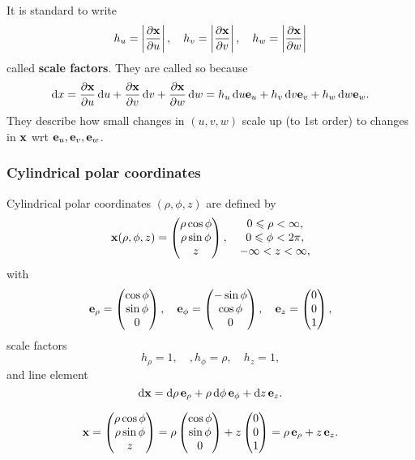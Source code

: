 It is standard to write 
\[
    h_u = \left| \frac{\partial {\bf x}}{\partial u}  \right| ,\quad h_v=\left| \frac{\partial {\bf x}}{\partial v}  \right|,\quad h_w=\left| \frac{\partial {\bf x}}{\partial w}  \right|
\]
called \textbf{scale factors}. They are called so because 
\[
    \mathrm{d} x = \frac{\partial {\bf x}}{\partial u}\,\mathrm{d} u+ \frac{\partial {\bf x}}{\partial v}\,\mathrm{d} v+\frac{\partial {\bf x}}{\partial w}\,\mathrm{d} w=h_u \,\mathrm{d} u {\bf e}_u+h_v \,\mathrm{d} v {\bf e}_v+h_w \,\mathrm{d} w {\bf e}_w.
\]
They describe how small changes in $ (u,v,w) $ scale up (to 1st order) to changes in ${\bf x}$ wrt $ {\bf e}_u,{\bf e}_v,{\bf e}_w $.

\subsubsection{Cylindrical polar coordinates}
Cylindrical polar coordinates $ (\rho,\phi,z) $ are defined by 
\[
    {\bf x}(\rho,\phi,z)= \begin{pmatrix}
        \rho\cos \phi \\ \rho \sin \phi \\ z
    \end{pmatrix}, \quad\begin{matrix}
        0\leqslant \rho< \infty, \\ 0\leqslant \phi<2\pi,\\ -\infty <z<\infty,
    \end{matrix}
\]
with 
\[
    {\bf e}_\rho=\begin{pmatrix}
        \cos \phi \\ \sin \phi \\ 0
    \end{pmatrix},\quad
    {\bf e}_\phi=\begin{pmatrix}
        -\sin\phi \\ \cos \phi \\ 0
    \end{pmatrix},\quad
    {\bf e}_z=\begin{pmatrix}
        0 \\ 0 \\ 1
    \end{pmatrix},
\]
scale factors
\[
    h_\rho=1,\quad,h_\phi=\rho,\quad h_z=1,
\]
and line element
\[
    \mathrm{d} {\bf x} = \mathrm{d} \rho\, {\bf e}_\rho+\rho\,\mathrm{d} \phi \, {\bf e}_\phi+\mathrm{d} z \, {\bf e}_z.
\]
\begin{note}
    \[
        {\bf x}=\begin{pmatrix}
            \rho\cos \phi \\ \rho \sin \phi \\ z
        \end{pmatrix}=\rho\begin{pmatrix}
            \cos \phi \\  \sin \phi \\ 0
        \end{pmatrix}+z \begin{pmatrix}
            0 \\ 0 \\ 1
        \end{pmatrix}=\rho\, {\bf e}_\rho+z\, {\bf e}_z.
    \]
\end{note}

